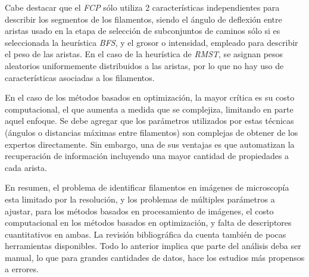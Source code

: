     

Cabe destacar que el {\it FCP} s\'olo utiliza 2 caracter\'isticas independientes para describir los segmentos de los filamentos, siendo el \'angulo de deflexi\'on entre aristas usado en la etapa de selecci\'on de subconjuntos de caminos s\'olo si es seleccionada la heur\'istica {\it BFS}, y el grosor o intensidad, empleado para describir el peso de las aristas. En el caso de la heur\'istica de {\it RMST}, se asignan pesos aleatorios uniformemente distribuidos a las aristas, por lo que no hay uso de caracter\'isticas asociadas a los filamentos.



En el caso de los m\'etodos basados en optimizaci\'on, la mayor cr\'itica es su costo computacional, el que aumenta a medida que se complejiza, limitando en parte aquel enfoque. Se debe agregar que los par\'ametros utilizados por estas t\'ecnicas (\'angulos o  distancias m\'aximas entre filamentos) son complejas de obtener de los expertos directamente. Sin embargo, una de sus ventajas es que automatizan la recuperaci\'on de informaci\'on incluyendo una mayor cantidad de propiedades a cada arista. 


En resumen, el problema de identificar filamentos en im\'agenes de microscop\'ia esta limitado por la resoluci\'on, y los problemas de m\'ultiples par\'ametros a ajustar, para los m\'etodos basados en procesamiento de im\'agenes, el costo computacional en los m\'etodos basados en optimizaci\'on, y falta de descriptores cuantitativos en ambas. La revisi\'on bibliogr\'afica da cuenta tambi\'en de pocas herramientas disponibles. Todo lo anterior implica que parte del an\'alisis deba ser manual, lo que para grandes cantidades de datos, hace los estudios m\'as propensos a errores. 


